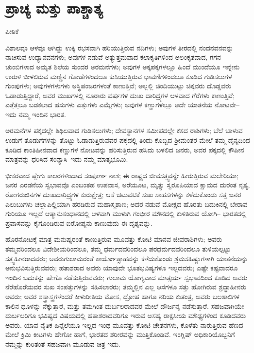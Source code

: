 
\chapter{ಪ್ರಾಚ್ಯ ಮತ್ತು ಪಾಶ್ಚಾತ್ಯ}

\begin{center}
ಪೀಠಿಕೆ
\end{center}

ವಿಶಾಲವೂ ಆಳವೂ ಆಗಿದ್ದು ಉಕ್ಕಿ ರಭಸವಾಗಿ ಹರಿಯುತ್ತಿರುವ ನದಿಗಳು; ಅವುಗಳ ತೀರದಲ್ಲಿ ನಂದನವನವನ್ನು ನಾಚಿಸುವ ಉದ್ಯಾನವನಗಳು; ಅವುಗಳ ನಡುವೆ ಅತ್ಯುತ್ತಮವಾದ ಕಲಾಕೃತಿಗಳಿಂದ ಅಲಂಕೃತವಾದ, ಗಗನ ಚುಂಬಿಗಳಾದ ಅಮೃತ ಶಿಲೆಯ ಸುಂದರ ಅರಮನೆಗಳು; ಅವುಗಳ ಅಕ್ಕಪಕ್ಕಗಳಲ್ಲೂ ಹಿಂದೆ ಮುಂದೆಯೂ ಇನ್ನೇನು ಉರುಳಿ ಬೀಳಲಿರುವ ಮಣ್ಣಿನ ಗೋಡೆಗಳಿಂದಲೂ ಕುಸಿಯುತ್ತಿರುವ ಛಾವಣಿಗಳಿಂದಲೂ ಕೂಡಿದ ಗುಡಿಸಲುಗಳ ಗುಂಪುಗಳು; ಅವುಗಳಗಳುಗಳು ಅಸ್ಥಿಪಂಜರಗಳಂತೆ ಕಾಣುತ್ತಿವೆ; ಅಲ್ಲಲ್ಲಿ ಚಿಂದಿಯುಟ್ಟು ಚಿಕ್ಕವರು ದೊಡ್ಡವರು ಓಡಾಡುತ್ತಿದ್ದಾರೆ, ಅವರ ಮುಖಗಳಲ್ಲಿ ನೂರಾರು ವರ್ಷಗಳ ದುಃಖ ದಾರಿದ್ರ್ಯಗಳ ಆಳವಾದ ಗೆರೆಗಳು ಕಾಣುತ್ತಿವೆ; ಎತ್ತೆತ್ತಲೂ ಬಡಕಲಾದ ಹಸುಗಳು ಎತ್ತುಗಳು ಎಮ್ಮೆಗಳು; ಅವುಗಳ ಕಣ್ಣುಗಳಲ್ಲೂ ಅದೇ ಯಾತನೆಯ ನೋಟವೇ– ಇದು ನಮ್ಮ ಇಂದಿನ ಭಾರತ.

ಅರಮನೆಗಳ ಪಕ್ಕದಲ್ಲೇ ಶಿಥಿಲವಾದ ಗುಡಿಸಲುಗಳು; ದೇವಸ್ಥಾನಗಳ ಸಮೀಪದಲ್ಲೇ ಕಸದ ರಾಶಿಗಳು; ಬೆಲೆ ಬಾಳುವ ಉಡುಗೆ ತೊಡುಗೆಗಳನ್ನು ತೊಟ್ಟು ಓಡಾಡುತ್ತಿರುವವರ ಪಕ್ಕದಲ್ಲಿ ತಿಂದು ಕೊಬ್ಬಿದ ಶ‍್ರೀಮಂತರ ಮೇಲೆ ತಮ್ಮ ದೈನ್ಯದಿಂದ ಕೂಡಿದ ಕಾಂತಿಹೀನವಾದ ಕಣ್ಣುಗಳ ನೋಟವನ್ನು ಹರಿಸುತ್ತಿರುವ ಹಸಿದು ಬಳಲಿದ ಜನರು, ಅವರ ಪಕ್ಕದಲ್ಲಿ ಕೌಪೀನ ಮಾತ್ರವನ್ನು ಧರಿಸಿದ ಸಂನ್ಯಾಸಿ–ಇದು ನಮ್ಮ ಮಾತೃಭೂಮಿ.

ಭೀಕರವಾದ ಪ್ಲೇಗು ಕಾಲರಗಳಿಂದಾದ ಸಂಪೂರ್ಣ ನಾಶ; ಈ ರಾಷ್ಟ್ರದ ಜೀವಸತ್ತ್ವ\break ವನ್ನೇ ಹೀರುತ್ತಿರುವ ಮಲೇರಿಯಾ; ಜನರ ಎರಡನೆಯ ಸ್ವಭಾವವೊ ಎಂಬಂತಹ ಉಪವಾಸ, ಅರೆಯೂಟ, ಮೃತ್ಯು ಸ್ವರೂಪಿಯಾದ ಕ್ಷಾಮದ ದುರಂತ ನೃತ್ಯ, ರೋಗರುಜಿನಗಳ ದುಃಖದಾರಿದ್ರ್ಯಗಳ ಕುರುಕ್ಷೇತ್ರ; ಆಸೆ ಚಟುವಟಿಕೆ ಸುಖ ಸಾಹಸಗಳನ್ನು ಕಳೆದುಕೊಂಡು ಸತ್ತ ಜನರ ಎಲುಬುಗಳು ಚಲ್ಲಾಪಿಲ್ಲಿಯಾಗಿ ಹರಡಿರುವ ಮಹಾಸ್ಮಶಾಣ; ಅದರ ನಡುವೆ ಮೋಕ್ಷದ ಹೊರತು ಬದುಕಿನಲ್ಲಿ ಬೇರಾವ ಗುರಿಯೂ ಇಲ್ಲದೆ ಆತ್ಮಾನುಸಂಧಾನದಲ್ಲಿ ಆಳವಾಗಿ ಮುಳುಗಿ ಗಂಭೀರ ಮೌನದಲ್ಲಿ ಕುಳಿತಿರುವ ಯೋಗಿ– ಭಾರತದಲ್ಲಿ ಪ್ರವಾಸವನ್ನು ಕೈಗೊಂಡಿರುವ ಐರೋಪ್ಯನು ಕಾಣುವುದು ಈ ದೃಶ್ಯವನ್ನು.

ಹೊರನೋಟಕ್ಕೆ ಮಾತ್ರ ಮನುಷ್ಯರಂತೆ ಕಾಣುತ್ತಿರುವ ಮೂವತ್ತು ಕೋಟಿ ಮಾನವ ಜೀವರಾಶಿಗಳು; ಅವರು ತಮ್ಮವರಿಂದಲೂ ವಿದೇಶೀಯರಿಂದಲೂ, ತಮ್ಮ ಧರ್ಮದವರಿಂದಲೂ ಪರಧರ್ಮದವರಿಂದಲೂ ತುಳಿಯಲ್ಪಟ್ಟು ಸತ್ತ್ವಹೀನರಾದವರು; ಅವರು\break ಗುಲಾಮರಂತೆ ಕಾರ್ಯೋತ್ಸಾಹವನ್ನು ಕಳೆದುಕೊಂಡು ಶ್ರಮಸಹಿಷ್ಣುಗಳಾಗಿ ಯಾತನೆಯನ್ನು ಅನುಭವಿಸುತ್ತಿರುವವರು; ಹತಾಶರಾದ ಅವರು ಯಾವುದೇ ಭೂತಭವಿಷ್ಯಗಳೂ ಇಲ್ಲದವರು; ಎಷ್ಟೇ ಕಷ್ಟವಾದರೂ ಇಂದಿನ ಬದುಕನ್ನು ಹೇಗೊ ನಡೆಸುತ್ತಿರುವವರು; ಗುಲಾಮ ಯೋಗ್ಯವಾದ ಮಾತ್ಸರ್ಯ ಸ್ವಭಾವದಿಂದ ಕೂಡಿದ ಅವರು ನೆರೆಹೊರೆಯವರ ಸುಖ ಸಂಪತ್ತುಗಳನ್ನು ಸಹಿಸಲಾರರು; ತಮ್ಮಲ್ಲಿನ ಎಲ್ಲ ಆಸೆಗಳೂ ಸತ್ತು ಹೋಗಿರುವ ಶ್ರದ್ಧಾಹೀನರು ಅವರು; ಅವರ ಶಸ್ತ್ರಾಸ್ತ್ರಗಳೆಂದರೆ ಕೀಳುರೀತಿಯ ಮೋಸ, ದ್ರೋಹ ಹಾಗೂ ನರಿಯ ಕುತಂತ್ರ, ಅವರು ಬಲಶಾಲಿಗಳ ಕಾಲಿನ ಧೂಳನ್ನು ನೆಕ್ಕುತ್ತಾರೆ, ಮತ್ತು ತಮಗಿಂತ ದುರ್ಬಲರಾದವರ ಮೇಲೆ ದೌರ್ಜನ್ಯ ನಡೆಸುತ್ತಾರೆ. ಸಹಜವಾಗಿಯೇ ದುರ್ಬಲರಿಗೂ ಭವಿಷ್ಯದ ವಿಷಯದಲ್ಲಿ ಹತಾಶರಾದವರಿಗೂ ಇರುವ ಅಸಹ್ಯ ರಾಕ್ಷಸೀಯ ಮೌಢ್ಯಗಳಿಂದ ಕೂಡಿದವರು ಅವರು. ಯಾವ ನೈತಿಕ ಹಿನ್ನೆಲೆಯೂ ಇಲ್ಲದ ಇಂಥ ಮೂವತ್ತು ಕೋಟಿ ಚೇತನಗಳು, ಕೊಳೆತು ನಾರುತ್ತಿರುವ ಹೆಣದ ಮೇಲೆ ಕ್ರಿಮಿ ಕೀಟಗಳು ಹೇಗೋ ಹಾಗೆ, ಭಾರತದ ಶರೀರವನ್ನು ಮುತ್ತಿಕೊಂಡಿವೆ. ಇಂಗ್ಲಿಷ್​ ಅಧಿಕಾರಿಯೊಬ್ಬನಿಗೆ ನಮ್ಮನ್ನು ಕುರಿತಂತೆ ಸಹಜವಾಗಿ ಮೂಡುವ ಚಿತ್ರ ಇದು.


